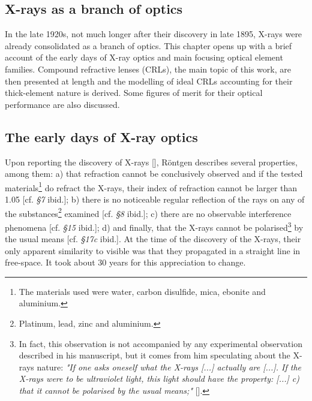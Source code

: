 
\begin{refsection}
\chapter{X-rays as a branch of optics}\label{sec:x-ray_optics}

In the late 1920s, not much longer after their discovery in late 1895, X-rays were already consolidated as a branch of optics. This chapter opens up with a brief account of the early days of X-ray optics and main focusing optical element families. Compound refractive lenses (CRLs), the main topic of this work, are then presented at length and the modelling of ideal CRLs accounting for their thick-element nature is derived. Some figures of merit for their optical performance are also discussed.

\section{The early days of X-ray optics}\label{sec:early_days}

Upon reporting the discovery of  X-rays [\cite{Roentgen1896_ch3}], R\"{o}ntgen describes several properties, among them: a) that refraction cannot be conclusively observed and if the tested materials\footnote{The materials used were water, carbon disulfide, mica, ebonite and aluminium.} do refract the X-rays, their index of refraction cannot be larger than 1.05 [cf. \textit{§7} ibid.]; b) there is no noticeable regular reflection of the rays on any of the substances\footnote{Platinum, lead, zinc and aluminium.} examined [cf. \textit{§8} ibid.]; c) there are no observable interference phenomena [cf. \textit{§15} ibid.]; d) and finally, that the X-rays cannot be polarised\footnote{In fact, this observation is not accompanied by any experimental observation described in his manuscript, but it comes from him speculating about the X-rays nature: \textit{"If one asks oneself what the X-rays [...] actually are [...]. If the X-rays were to be ultraviolet light, this light should have the property: [...] c)
that it cannot be polarised by the usual means;"} [\cite[\textit{§17}]{Roentgen1896_ch3}].} by the usual means [cf. \textit{§17c} ibid.]. At the time of the discovery of the X-rays, their only apparent similarity to visible was that they propagated in a straight line in free-space. It took about 30 years for this appreciation to change.


\end{refsection}
